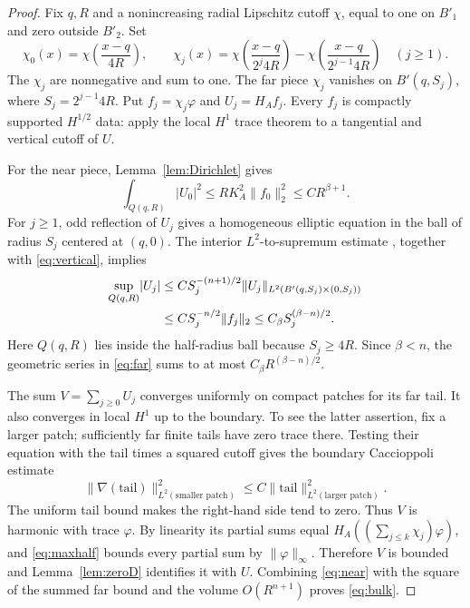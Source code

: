 \documentclass[11pt]{article}
\newcommand{\norm}[1]{\lVert #1\rVert}
\newcommand{\abs}[1]{\lvert #1\rvert}
\begin{document}
\begin{proof}
Fix $q,R$ and a nonincreasing radial Lipschitz cutoff $\chi$, equal to one
on $B'_1$ and zero outside $B'_2$. Set
\[
 \chi_0(x)=\chi\left(\frac{x-q}{4R}\right),\qquad
 \chi_j(x)=\chi\left(\frac{x-q}{2^j4R}\right)
             -\chi\left(\frac{x-q}{2^{j-1}4R}\right)\quad(j\geq1).
\]
The $\chi_j$ are nonnegative and sum to one. The far piece $\chi_j$ vanishes
on $B'(q,S_j)$, where $S_j=2^{j-1}4R$. Put
$f_j=\chi_j\varphi$ and $U_j=H_Af_j$.
Every $f_j$ is compactly supported $H^{1/2}$ data: apply the local $H^1$
trace theorem to a tangential and vertical cutoff of $U$.

For the near piece, Lemma~\ref{lem:Dirichlet} gives
\begin{equation}\label{eq:near}
 \int_{Q(q,R)}\abs{U_0}^2
       \leq R K_A^2\norm{f_0}_2^2\leq C R^{\beta+1}.
\end{equation}
For $j\geq1$, odd reflection of $U_j$ gives a homogeneous elliptic equation
in the ball of radius $S_j$ centered at $(q,0)$. The interior
$L^2$-to-supremum estimate \cite[Theorem 5.1]{Trudinger}, together with
\eqref{eq:vertical}, implies
\begin{align}\label{eq:far}
 \sup_{Q(q,R)}\abs{U_j}
 &\leq C S_j^{-(n+1)/2}
      \norm{U_j}_{L^2(B'(q,S_j)\times(0,S_j))}\notag\\
 &\leq C S_j^{-n/2}\norm{f_j}_2
 \leq C_\beta S_j^{(\beta-n)/2}.
\end{align}
Here $Q(q,R)$ lies inside the half-radius ball because $S_j\geq4R$.
Since $\beta<n$, the geometric series in \eqref{eq:far} sums to at most
$C_\beta R^{(\beta-n)/2}$.

The sum $V=\sum_{j\geq0}U_j$ converges uniformly on compact patches for its
far tail. It also converges in local $H^1$ up to the boundary. To see the
latter assertion, fix a larger patch; sufficiently far finite tails have
zero trace there. Testing their equation with the tail times a squared
cutoff gives the boundary Caccioppoli estimate
\[
 \norm{\nabla(\text{tail})}_{L^2(\text{smaller patch})}^2
     \leq C\norm{\text{tail}}_{L^2(\text{larger patch})}^2.
\]
The uniform tail bound makes the right-hand side tend to zero. Thus $V$ is
harmonic with trace $\varphi$. By linearity its partial sums equal
$H_A((\sum_{j\leq k}\chi_j)\varphi)$, and \eqref{eq:maxhalf} bounds every
partial sum by $\norm\varphi_\infty$. Therefore $V$ is bounded and
Lemma~\ref{lem:zeroD} identifies it with $U$.
Combining \eqref{eq:near} with the square of the summed far bound and the
volume $O(R^{n+1})$ proves \eqref{eq:bulk}.
\end{proof}
\end{document}
